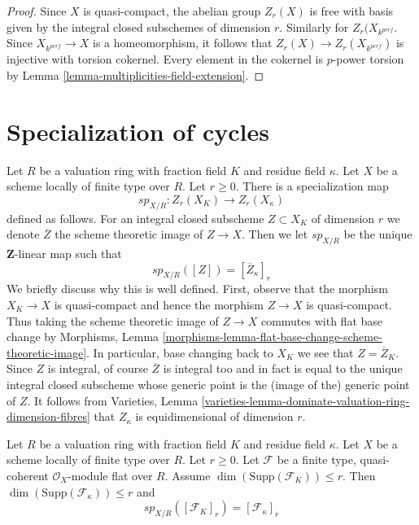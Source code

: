 \begin{proof}
Since $X$ is quasi-compact, the abelian group $Z_r(X)$ is free with basis
given by the integral closed subschemes of dimension $r$. Similarly for
$Z_r(X_{k^{perf}}$.
Since $X_{k^{perf}} \to X$ is a homeomorphism, it follows
that $Z_r(X) \to Z_r(X_{k^{perf}})$ is injective with torsion cokernel.
Every element in the cokernel is $p$-power torsion by
Lemma \ref{lemma-multiplicities-field-extension}.
\end{proof}





\section{Specialization of cycles}
\label{section-specialization}

\noindent
Let $R$ be a valuation ring with fraction field $K$ and residue field $\kappa$.
Let $X$ be a scheme locally of finite type over $R$. Let $r \geq 0$.
There is a specialization map
$$
sp_{X/R} : Z_r(X_K) \longrightarrow Z_r(X_\kappa)
$$
defined as follows. For an integral closed subscheme $Z \subset X_K$
of dimension $r$ we denote $\overline{Z}$ the scheme theoretic image
of $Z \to X$. Then we let $sp_{X/R}$ be the unique $\mathbf{Z}$-linear
map such that
$$
sp_{X/R}([Z]) = [\overline{Z}_\kappa]_r
$$
We briefly discuss why this is well defined. First, observe that the
morphism $X_K \to X$ is quasi-compact and hence the morphism $Z \to X$
is quasi-compact. Thus taking the scheme theoretic image of $Z \to X$
commutes with flat base change by
Morphisms, Lemma \ref{morphisms-lemma-flat-base-change-scheme-theoretic-image}.
In particular, base changing back to $X_K$ we see that $Z = \overline{Z}_K$.
Since $Z$ is integral, of course $\overline{Z}$ is integral too and
in fact is equal to the unique integral closed subscheme whose generic
point is the (image of the) generic point of $Z$. It follows from
Varieties, Lemma \ref{varieties-lemma-dominate-valuation-ring-dimension-fibres}
that $Z_\kappa$ is equidimensional of dimension $r$.

\begin{lemma}
\label{lemma-specialization-module}
Let $R$ be a valuation ring with fraction field $K$ and residue field $\kappa$.
Let $X$ be a scheme locally of finite type over $R$. Let $r \geq 0$.
Let $\mathcal{F}$ be a finite type, quasi-coherent $\mathcal{O}_X$-module
flat over $R$. Assume $\dim(\text{Supp}(\mathcal{F}_K)) \leq r$.
Then $\dim(\text{Supp}(\mathcal{F}_\kappa)) \leq r$ and
$$
sp_{X/R}([\mathcal{F}_K]_r) = [\mathcal{F}_\kappa]_r
$$
\end{lemma}

